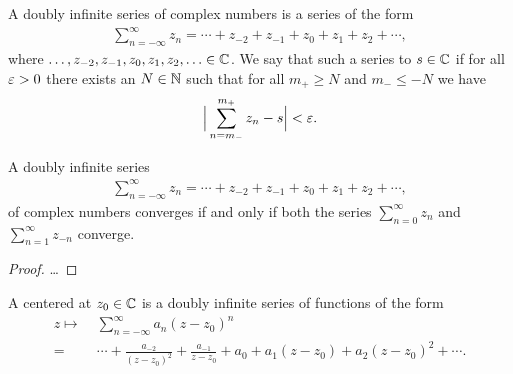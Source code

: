 \begin{definition}
  \label{def:doubly_infinite_series}
  A doubly infinite series of complex numbers is a series of the form
  \begin{align*}
    \sum_{n=-\infty}^\infty z_n
      = \cdots + z_{-2} + z_{-1} + z_0 + z_1 + z_2 + \cdots ,
  \end{align*}
  where $\ldots, z_{-2}, z_{-1}, z_0, z_1, z_2, \ldots \in \mathbb{C}$.
  We say that such a series  to $s \in \mathbb{C}$ if
  for all $\varepsilon > 0$ there exists an $N \in \mathbb{N}$
  such that for all $m_+ \ge N$ and $m_- \le -N$ we have
  \begin{align*}
    \Big| \sum_{n=m_-}^{m_+} z_n - s \Big| < \varepsilon .
  \end{align*}
\end{definition}

\begin{lemma}
  \label{lem:convergence_doubly_infinite}
  A doubly infinite series
  \begin{align*}
    \sum_{n=-\infty}^\infty z_n
      = \cdots + z_{-2} + z_{-1} + z_0 + z_1 + z_2 + \cdots ,
  \end{align*}
  of complex numbers converges if and only if both the series
  $\sum_{n=0}^\infty z_n$ and $\sum_{n=1}^\infty z_{-n}$ converge.
\end{lemma}
\begin{proof}
  \ldots
\end{proof}

\begin{definition}
  \label{def:laurent_series}
  A  centered at $z_0 \in \mathbb{C}$ is a doubly infinite series
  of functions of the form
  \begin{align*}
    z \mapsto & \; \sum_{n=-\infty}^\infty a_n (z - z_0)^n \\
         = & \; \cdots + \frac{a_{-2}}{(z-z_0)^2} + \frac{a_{-1}}{z-z_0}
                + a_0 + a_1 (z-z_0) + a_2 (z-z_0)^2 + \cdots .
  \end{align*}
\end{definition}


